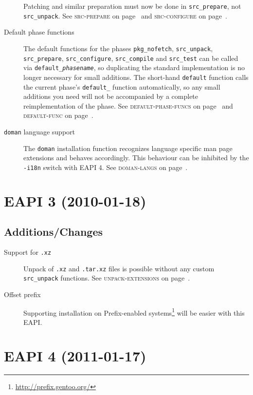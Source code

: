 \documentclass[a4paper,notumble]{leaflet}
\newcommand{\code}[1]{\texttt{#1}}
\newcommand{\featureref}[1]{\textsc{#1} on page~\pageref{feat:#1}}
\begin{document}
\begin{description}
    Patching and similar preparation must now be done in
    \code{src\_prepare}, not \code{src\_unpack}.  See
    \featureref{src-prepare} and \featureref{src-configure}.
    \item[Default phase functions] The default functions for the
    phases \code{pkg\_nofetch}, \code{src\_unpack},
    \code{src\_prepare}, \code{src\_configure}, \code{src\_compile}
    and \code{src\_test} can be called via
    \code{default\_\emph{phasename}}, so duplicating the standard
    implementation is no longer necessary for small additions.  The
    short-hand \code{default} function calls the current phase's
    \code{default\_} function automatically, so any small additions
    you need will not be accompanied by a complete reimplementation of
    the phase.  See \featureref{default-phase-funcs} and
    \featureref{default-func}.
    \item[\code{doman} language support] The \code{doman} installation
    function recognizes language specific man page extensions and
    behaves accordingly.  This behaviour can be inhibited by the
    \code{-i18n} switch with EAPI 4.  See \featureref{doman-langs}.
\end{description}
\newpage

\section{EAPI 3 (2010-01-18)}
\label{sec:cs:eapi3}
\subsection{Additions/Changes}
\label{sec:cs:eapi3-additions}
\begin{description}
    \item[Support for \code{.xz}] Unpack of \code{.xz} and
    \code{.tar.xz} files is possible without any custom
    \code{src\_unpack} functions.  See \featureref{unpack-extensions}.
    \item[Offset prefix] Supporting installation on Prefix-enabled
    systems\footnote{\url{http://prefix.gentoo.org/}} will be easier
    with this EAPI.
\end{description}

\section{EAPI 4 (2011-01-17)}
\label{sec:cs:eapi4}
\end{document}
